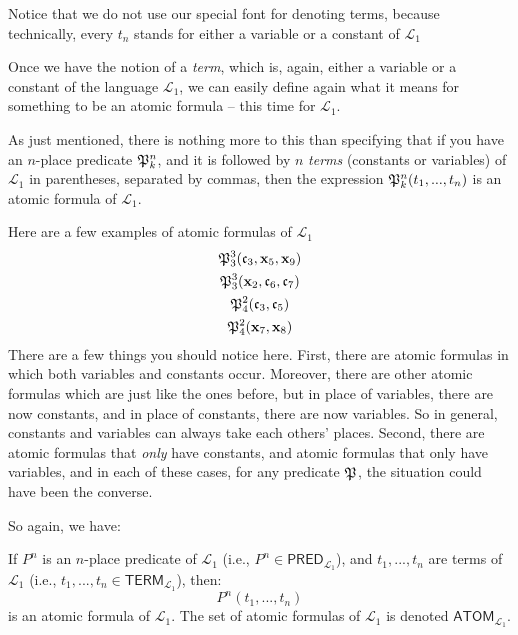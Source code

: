\begin{remark}
Notice that we do not use our special font for denoting terms, because technically, every $t_n$ stands for either a variable or a constant of $\mathcal{L}_1$ 
\end{remark}

Once we have the notion of a \textit{term}, which is, again, either a variable or a constant of the language $\mathcal{L}_1$, we can easily define again what it means for something to be an atomic formula -- this time for $\mathcal{L}_1$.

As just mentioned, there is nothing more to this than specifying that if you have an $n$-place predicate $\mathfrak{P}^{n}_{k}$, and it is followed by $n$ \textit{terms} (constants or variables) of $\mathcal{L}_1$ in parentheses, separated by commas, then the expression $\mathfrak{P}^{n}_{k}(t_1, ..., t_n)$ is an atomic formula of $\mathcal{L}_1$.

Here are a few examples of atomic formulas of $\mathcal{L}_1$
%
\begin{gather*}
	\mathfrak{P}^{3}_{3}(\mathfrak{c}_{3},  \mathbf{x}_{5}, \mathbf{x}_{9})\\
	\mathfrak{P}^{3}_{3}(\mathbf{x}_{2},  \mathfrak{c}_{6}, \mathfrak{c}_{7})\\
	\mathfrak{P}^{2}_{4}(\mathfrak{c}_{3}, \mathfrak{c}_{5})\\
	\mathfrak{P}^{2}_{4}(\mathbf{x}_{7}, \mathbf{x}_{8})
\end{gather*}
%
There are a few things you should notice here. First, there are atomic formulas in which both variables and constants occur. Moreover, there are other atomic formulas which are just like the ones before, but in place of variables, there are now constants, and in place of constants, there are now variables. So in general, constants and variables can always take each others' places. Second, there are atomic formulas that \textit{only} have constants, and atomic formulas that only have variables, and in each of these cases, for any predicate $\mathfrak{P}^{}_{}$, the situation could have been the converse.

So again, we have:

\begin{defn}
If $P^n$ is an $n$-place predicate of $\mathcal{L}_1$ (i.e., $P^n \in \textsf{PRED}_{\mathcal{L}_1}$), and $t_1, ..., t_n$ are terms of $\mathcal{L}_1$ (i.e., $t_1, ..., t_n \in \mathsf{TERM}_{\mathcal{L}_1}$), then:
\[
P^n(t_1, ..., t_n)
\]
is an atomic formula of $\mathcal{L}_1$. The set of atomic formulas of $\mathcal{L}_1$ is denoted $\textsf{ATOM}_{\mathcal{L}_1}$.
\end{defn}

